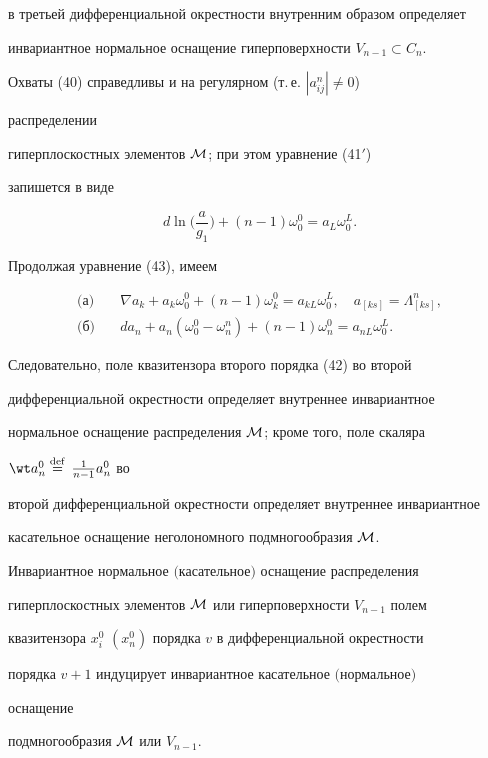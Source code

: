 в третьей дифференциальной окрестности внутренним образом определяет 


инвариантное нормальное оснащение гиперповерхности $V_{n-1}\subset C_n$. 


 


Охваты (40) справедливы и на регулярном (т.\,е. $|a^n_{ij}|\ne0$) 


распределении 


гиперплоскостных элементов $\cal M$; при этом уравнение (41$'$) 


запишется в виде 


\begin{equation} 


d\ln\bigg(\frac{a}{g_1} \bigg)+(n-1)\omega^0_0=a_L\omega^L_0. 


\end{equation} 


Продолжая уравнение (43), имеем 


\begin{align*} 


\text{(а)}\quad &\nabla a_k+a_k\omega^0_0+(n-1) 


\omega^0_k=a_{k L}\omega^L_0,\quad a_{[k s]}=\Lambda^n_{[k s]},\\ 


% 


\text{(б)}\quad &d a_n+a_n(\omega^0_0-\omega^n_n)+(n-1) 


\omega^0_n=a_{n L}\omega^L_0. 


\end{align*} 


Следовательно, поле квазитензора второго порядка (42) во второй 


дифференциальной окрестности определяет внутреннее инвариантное 


нормальное оснащение распределения $\cal M$; кроме того, поле скаляра


$\wt a^0_n\eqdef\frac{1}{n-1}a^0_n$ во 


второй дифференциальной окрестности определяет внутреннее инвариантное 


касательное оснащение неголономного подмногообразия $\cal M$. 


 


\begin{thm} 


Инвариантное нормальное $($касательное$)$ оснащение распределения 


гиперплоскостных элементов $\cal M$ или гиперповерхности $V_{n-1}$ полем 


квазитензора $x^0_i$ $(x^0_n)$ порядка $v$ в дифференциальной окрестности 


порядка $v+1$ индуцирует инвариантное касательное $($нормальное$)$ 


оснащение 


подмногообразия $\cal M$ или $V_{n-1}$. 


\end{thm} 


